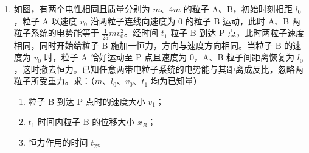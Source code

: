 \documentclass[\gkver]{gaokaozhenti}
\begin{document}
\begin{enumerate}
{根据洛伦兹力提供向心力可得 $e\frac{B_{0}}{2}v_{x} = \frac{mv_{x}^{2}}{R_{0}}$

联立解得 $v_{x} = \frac{v_{0}}{2}$

由射出到相切，经过半个周期，用时 $t = \frac{T}{2} = \frac{1}{2} \times \frac{2\pi m}{e\frac{B_{0}}{2}} = \frac{2\pi m}{eB_{0}} = \frac{\pi R}{v_{0}}$

根据速度的合成与分解可知 $v_{y} = \sqrt{v_{0}^{2} - v_{x}^{2}} = \frac{\sqrt{3}}{2}v_{0}$

平行轴线方向运动距离 $y = v_{y}t = \frac{\sqrt{3}\pi}{2}R$

结合对称性，被电子击中的面积 $S = 2 \times 2\pi Ry = 2\sqrt{3}\pi^{2}R^{2}$
}

\item
如图，有两个电性相同且质量分别为 $m$、$4m$ 的粒子 A、B，初始时刻相距 $l_{0}$，粒子 A 以速度 $v_{0}$ 沿两粒子连线向速度为 $0$ 的粒子 B 运动，此时 A、B 两粒子系统的电势能等于 $\frac{1}{25}mv_{0}^{2}$。经时间 $t_{1}$ 粒子 B 到达 P 点，此时两粒子速度相同，同时开始给粒子 B 施加一恒力，方向与速度方向相同。当粒子 B 的速度为 $v_{0}$ 时，粒子 A 恰好运动至 P 点且速度为 $0$，A、B 粒子间距离恢复为 $l_{0}$，这时撤去恒力。已知任意两带电粒子系统的电势能与其距离成反比，忽略两粒子所受重力。求：（$m$、$l_{0}$、$v_{0}$、$t_{1}$ 均为已知量）
\begin{enumerate}
	\item
	粒子 B 到达 P 点时的速度大小 $v_{1}$；
	\item
	$t_{1}$ 时间内粒子 B 的位移大小 $x_{B}$；
	\item
	恒力作用的时间 $t_{2}$。
\end{enumerate}
\onepicture[align=right, w=7.24cm]{}
\end{enumerate}
\end{document}
